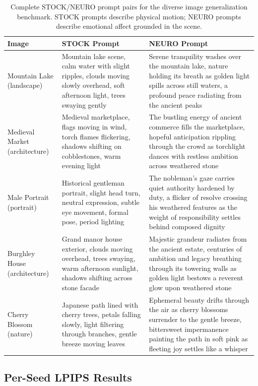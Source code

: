 \documentclass[10pt,twocolumn,letterpaper]{article}
\begin{document}
\begin{table}[h]
\centering
\small
\begin{tabular}{p{2cm}p{6cm}p{6cm}}
\toprule
\textbf{Image} & \textbf{STOCK Prompt} & \textbf{NEURO Prompt} \\
\midrule
Mountain Lake (landscape) & Mountain lake scene, calm water with slight ripples, clouds moving slowly overhead, soft afternoon light, trees swaying gently & Serene tranquility washes over the mountain lake, nature holding its breath as golden light spills across still waters, a profound peace radiating from the ancient peaks \\
\midrule
Medieval Market (architecture) & Medieval marketplace, flags moving in wind, torch flames flickering, shadows shifting on cobblestones, warm evening light & The bustling energy of ancient commerce fills the marketplace, hopeful anticipation rippling through the crowd as torchlight dances with restless ambition across weathered stone \\
\midrule
Male Portrait (portrait) & Historical gentleman portrait, slight head turn, neutral expression, subtle eye movement, formal pose, period lighting & The nobleman's gaze carries quiet authority hardened by duty, a flicker of resolve crossing his weathered features as the weight of responsibility settles behind composed dignity \\
\midrule
Burghley House (architecture) & Grand manor house exterior, clouds moving overhead, trees swaying, warm afternoon sunlight, shadows shifting across stone facade & Majestic grandeur radiates from the ancient estate, centuries of ambition and legacy breathing through its towering walls as golden light bestows a reverent glow upon weathered stone \\
\midrule
Cherry Blossom (nature) & Japanese path lined with cherry trees, petals falling slowly, light filtering through branches, gentle breeze moving leaves & Ephemeral beauty drifts through the air as cherry blossoms surrender to the gentle breeze, bittersweet impermanence painting the path in soft pink as fleeting joy settles like a whisper \\
\bottomrule
\end{tabular}
\caption{Complete STOCK/NEURO prompt pairs for the diverse image generalization benchmark. STOCK prompts describe physical motion; NEURO prompts describe emotional affect grounded in the scene.}
\label{tab:diverse_prompts}
\end{table}

\subsection{Per-Seed LPIPS Results}
\end{document}
